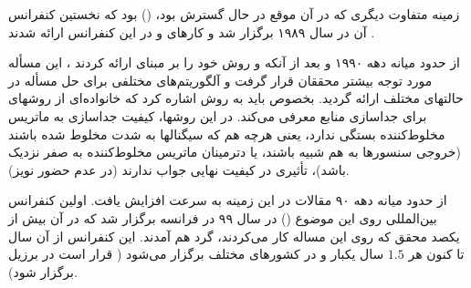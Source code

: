 زمینه متفاوت دیگری که در آن موقع در حال گسترش بود،  
 () بود که نخستین کنفرانس آن در سال  
۱۹۸۹ برگزار شد و کارهای  و   در این کنفرانس ارائه شدند
\cite{Card89b,Como89c}.

از حدود میانه دهه ۱۹۹۰ و بعد از آنکه  و  روش خود را بر مبنای
 ارائه کردند \cite{BellS95}، این مسأله مورد توجه بیشتر
محققان قرار گرفت و آلگوریتم‌های مختلفی برای حل مسأله در حالتهای مختلف
ارائه گردید. بخصوص باید به روش \cite{CardL96} اشاره کرد که خانواده‌ای از 
روشهای  برای جداسازی منابع معرفی می‌کند. در این روشها، 
کیفیت جداسازی به   ماتریس مخلوط‌کننده بستگی
ندارد، یعنی هرچه هم که سیگنالها به شدت مخلوط شده باشند (خروجی
سنسورها به هم شبیه باشند، یا دترمینان ماتریس مخلوط‌کننده به صفر نزدیک باشد)، 
تأثیری در کیفیت نهایی جواب ندارند (در عدم حضور نویز).

از حدود میانه دهه ۹۰ مقالات در این زمینه به سرعت افزایش یافت. اولین
کنفرانس بین‌المللی روی این موضوع () در سال ۹۹  در فرانسه برگزار شد 
که در آن بیش از یکصد محقق که روی این مساله کار می‌کردند، 
گرد هم آمدند. این کنفرانس از آن سال تا کنون هر $1.5$ سال یکبار و
در کشورهای مختلف برگزار می‌شود ( قرار است در برزیل برگزار شود).

